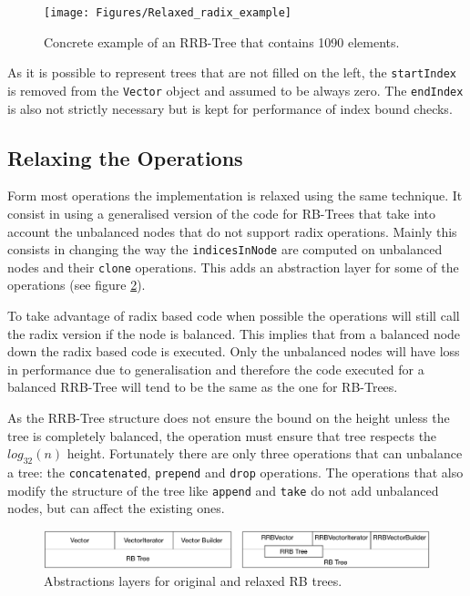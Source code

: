 \begin{figure}[h!]
  \centering
  \texttt{[image: Figures/Relaxed\_radix\_example]}
  \caption{Concrete example of an RRB-Tree that contains 1090 elements.}
  \label{Relaxed_radix_example}
\end{figure}

As it is possible to represent trees that are not filled on the left, the \texttt{startIndex} is removed from the \texttt{Vector} object and assumed to be always zero. The \texttt{endIndex} is also not strictly necessary but is kept for performance of index bound checks.

\subsection{Relaxing the Operations}
Form most operations the implementation is relaxed using the same technique. It consist in using a generalised version of the code for RB-Trees that take into account the unbalanced nodes that do not support radix operations. Mainly this consists in changing the way the \texttt{indicesInNode} are computed on unbalanced nodes and their \texttt{clone} operations. This adds an abstraction layer for some of the operations (see figure \ref{AbstractionsLayers}).

To take advantage of radix based code when possible the operations will still call the radix version if the node is balanced. This implies that from a balanced node down the radix based code is executed. Only the unbalanced nodes will have loss in performance due to generalisation and therefore the code executed for a balanced RRB-Tree will tend to be the same as the one for RB-Trees.

As the RRB-Tree structure does not ensure the bound on the height unless the tree is completely balanced, the operation must ensure that tree respects the $log_{32}(n)$ height. Fortunately there are only three operations that can unbalance a tree: the \texttt{concatenated}, \texttt{prepend} and \texttt{drop} operations. The operations that also modify the structure of the tree like \texttt{append} and \texttt{take} do not add unbalanced nodes, but can affect the existing ones.

\begin{figure}[h!]
  \centering
  \includegraphics[width=\textwidth]{Figures/AbstractionsLayers}
  \caption{Abstractions layers for original and relaxed RB trees.}
  \label{AbstractionsLayers}
\end{figure}

